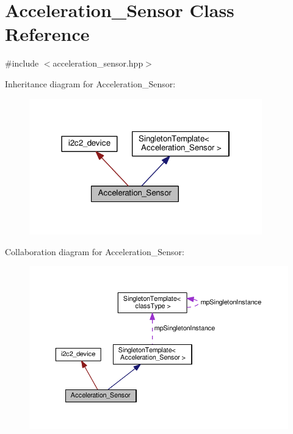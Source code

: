 \hypertarget{classAcceleration__Sensor}{}\section{Acceleration\+\_\+\+Sensor Class Reference}
\label{classAcceleration__Sensor}


{\ttfamily \#include $<$acceleration\+\_\+sensor.\+hpp$>$}



Inheritance diagram for Acceleration\+\_\+\+Sensor\+:\nopagebreak
\begin{figure}[H]
\begin{center}
\leavevmode
\includegraphics[width=286pt]{de/db6/classAcceleration__Sensor__inherit__graph}
\end{center}
\end{figure}


Collaboration diagram for Acceleration\+\_\+\+Sensor\+:\nopagebreak
\begin{figure}[H]
\begin{center}
\leavevmode
\includegraphics[width=350pt]{d4/d70/classAcceleration__Sensor__coll__graph}
\end{center}
\end{figure}
